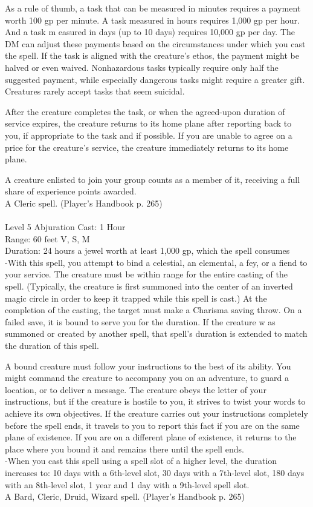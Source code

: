 \documentclass[10pt,twocolumn]{report}
\begin{document}
As a rule of thumb, a task that can be measured in minutes requires a payment worth 100 gp per minute. A task measured in hours requires 1,000 gp per hour. And a task m easured in days (up to 10 days) requires 10,000 gp per day. The DM can adjust these payments based on the circumstances under which you cast the spell. If the task is aligned with the creature’s ethos, the payment might be halved or even waived. Nonhazardous tasks typically require only half the suggested payment, while especially dangerous tasks might require a greater gift. Creatures rarely accept tasks that seem suicidal.

After the creature completes the task, or when the agreed-upon duration of service expires, the creature returns to its home plane after reporting back to you, if appropriate to the task and if possible. If you are unable to agree on a price for the creature’s service, the creature immediately returns to its home plane.

A creature enlisted to join your group counts as a member of it, receiving a full share of experience points awarded.\\
A Cleric spell. (Player's Handbook p. 265) \\


 \\
Level 5 \quad Abjuration \quad Cast: 1 Hour\\
Range: 60 feet \quad V, S, M\\
Duration: 24 hours \quad a jewel worth at least 1,000 gp, which the spell consumes\\
-With this spell, you attempt to bind a celestial, an elemental, a fey, or a fiend to your service.
The creature must be within range for the entire casting of the spell. (Typically, the creature is first summoned into the center of an inverted magic circle in order to keep it trapped while this spell is cast.) At the completion of the casting, the target must make a Charisma saving throw. On a failed save, it is bound to serve you for the duration. If the creature w as summoned or created by another spell, that spell’s duration is extended to match the duration of this spell.

A bound creature must follow your instructions to the best of its ability. You might command the creature to accompany you on an adventure, to guard a location, or to deliver a message. The creature obeys the letter of your instructions, but if the creature is hostile to you, it strives to twist your words to achieve its own objectives. If the creature carries out your instructions completely before the spell ends, it travels to you to report this fact if you are on the same plane of existence. If you are on a different plane of existence, it returns to the place where you bound it and remains there until the spell ends.\\
-When you cast this spell using a spell slot of a higher level, the duration increases to:
10 days with a 6th-level slot,
30 days with a 7th-level slot,
180 days with an 8th-level slot, 
1 year and 1 day with a 9th-level spell slot.\\
A Bard, Cleric, Druid, Wizard spell. (Player's Handbook p. 265) \\
\end{document}
